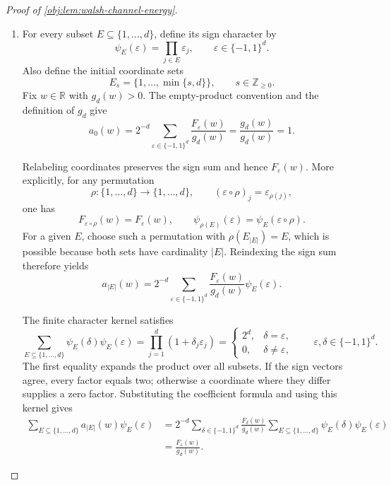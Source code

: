\documentclass[11pt]{article}
\begin{document}
\begin{proof}[Proof of \cref{obj:lem:walsh-channel-energy}]
\begin{enumerate}
\item For every subset \(E\subseteq\{1,\ldots,d\}\), define its sign character by
\[
\psi_E(\varepsilon)=\prod_{j\in E}\varepsilon_j,
\qquad \varepsilon\in\{-1,1\}^d.
\]
Also define the initial coordinate sets
\[
E_s=\{1,\ldots,\min\{s,d\}\},
\qquad s\in\mathbb Z_{\ge0}.
\]
Fix \(w\in\mathbb R\) with \(g_d(w)>0\). The empty-product convention and the definition of \(g_d\) give
\[
a_0(w)
=2^{-d}\sum_{\varepsilon\in\{-1,1\}^d}
\frac{F_\varepsilon(w)}{g_d(w)}
=\frac{g_d(w)}{g_d(w)}
=1.
\]

Relabeling coordinates preserves the sign sum and hence \(F_\varepsilon(w)\). More explicitly, for any permutation
\[
\rho:\{1,\ldots,d\}\longrightarrow\{1,\ldots,d\},
\qquad
(\varepsilon\circ\rho)_j=\varepsilon_{\rho(j)},
\]
one has
\[
F_{\varepsilon\circ\rho}(w)=F_\varepsilon(w),
\qquad
\psi_{\rho(E)}(\varepsilon)=\psi_E(\varepsilon\circ\rho).
\]
For a given \(E\), choose such a permutation with
\(\rho(E_{|E|})=E\), which is possible because both sets have cardinality \(|E|\). Reindexing the sign sum therefore yields
\[
a_{|E|}(w)
=2^{-d}\sum_{\varepsilon\in\{-1,1\}^d}
\frac{F_\varepsilon(w)}{g_d(w)}\psi_E(\varepsilon).
\]

The finite character kernel satisfies
\[
\sum_{E\subseteq\{1,\ldots,d\}}
\psi_E(\delta)\psi_E(\varepsilon)
=
\prod_{j=1}^d(1+\delta_j\varepsilon_j)
=
\begin{cases}
2^d,&\delta=\varepsilon,\\
0,&\delta\ne\varepsilon,
\end{cases}
\qquad \varepsilon,\delta\in\{-1,1\}^d.
\]
The first equality expands the product over all subsets. If the sign vectors agree, every factor equals two; otherwise a coordinate where they differ supplies a zero factor. Substituting the coefficient formula and using this kernel gives
\[
\begin{aligned}
\sum_{E\subseteq\{1,\ldots,d\}}
a_{|E|}(w)\psi_E(\varepsilon)
&=
2^{-d}\sum_{\delta\in\{-1,1\}^d}
\frac{F_\delta(w)}{g_d(w)}
\sum_{E\subseteq\{1,\ldots,d\}}
\psi_E(\delta)\psi_E(\varepsilon)\\
&=\frac{F_\varepsilon(w)}{g_d(w)}.
\end{aligned}
\]


\end{enumerate}
\end{proof}
\end{document}
